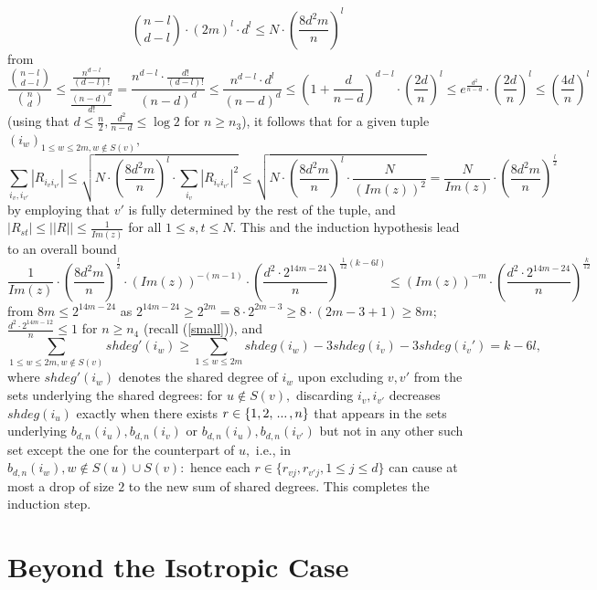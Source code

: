 \documentclass{article}
\numberwithin{equation}{section}
\begin{document}
\[\binom{n-l}{d-l} \cdot (2m)^l  \cdot d^l \leq N \cdot (\frac{8d^2m}{n})^l\]
from
\[\frac{\binom{n-l}{d-l}}{\binom{n}{d}} \leq \frac{\frac{n^{d-l}}{(d-l)!}}{\frac{(n-d)^d}{d!}}=\frac{n^{d-l} \cdot \frac{d!}{(d-l)!}}{(n-d)^d} \leq \frac{n^{d-l} \cdot d^{l}}{(n-d)^d} \leq (1+\frac{d}{n-d})^{d-l} \cdot (\frac{2d}{n})^l \leq e^{\frac{d^2}{n-d}} \cdot(\frac{2d}{n})^l\leq (\frac{4d}{n})^l\]
(using that \(d \leq \frac{n}{2}, \frac{d^2}{n-d} \leq \log{2}\) for \(n \geq n_3\)), it follows that for a given tuple \((i_w)_{1 \leq w \leq 2m, w \not \in S(v)},\)
\[\sum_{i_v,i_{v'}}{|R_{i_vi_{v'}}|} \leq \sqrt{N \cdot (\frac{8d^2m}{n})^l  \cdot \sum_{i_v}{|R_{i_vi_{v'}}|^2}} \leq \sqrt{N \cdot (\frac{8d^2m}{n})^l \cdot \frac{N}{(Im(z))^2}}=\frac{N}{Im(z)} \cdot (\frac{8d^2m}{n})^{\frac{l}{2}}\]
by employing that \(v'\) is fully determined by the rest of the tuple, and \(|R_{st}| \leq ||R|| \leq \frac{1}{Im(z)}\) for all \(1 \leq s,t \leq N.\) This and the induction hypothesis lead to an overall bound
\[\frac{1}{Im(z)} \cdot (\frac{8d^2m}{n})^{\frac{l}{2}} \cdot (Im(z))^{-(m-1)} \cdot (\frac{d^2 \cdot 2^{14m-24}}{n})^{\frac{1}{12}(k-6l)} \leq (Im(z))^{-m} \cdot (\frac{d^2 \cdot 2^{14m-24}}{n})^{\frac{k}{12}}\]
from \(8m \leq 2^{14m-24}\) as \(2^{14m-24} \geq 2^{2m}=8 \cdot 2^{2m-3} \geq 8 \cdot (2m-3+1) \geq 8m;\) \(\frac{d^2 \cdot 2^{14m-12}}{n} \leq 1\) for \(n \geq n_4\) (recall (\ref{small})), and 
\[\sum_{1 \leq w \leq 2m, w \not \in S(v)}{shdeg'(i_w)} \geq \sum_{1 \leq w \leq 2m}{shdeg(i_w)}-3shdeg(i_v)-3shdeg(i_v')=k-6l,\]
where \(shdeg'(i_w)\) denotes the shared degree of \(i_w\) upon excluding \(v,v'\) from the sets underlying the shared degrees: for \(u \not \in S(v),\) discarding \(i_v,i_{v'}\) decreases \(shdeg(i_u)\) exactly when there exists \(r \in \{1,2,\hspace{0.05cm}...\hspace{0.05cm},n\}\) that appears in the sets underlying \(b_{d,n}(i_u),b_{d,n}(i_v)\) or \(b_{d,n}(i_u),b_{d,n}(i_{v'})\) but not in any other such set except the one for the counterpart of \(u,\) i.e., in \(b_{d,n}(i_w), w \not \in S(u) \cup S(v):\) hence each \(r \in \{r_{vj},r_{v'j},1 \leq j \leq d\}\) can cause at most a drop of size \(2\) to the new sum of shared degrees. This completes the induction step.

\section{Beyond the Isotropic Case}\label{sectgen}
\end{document}
